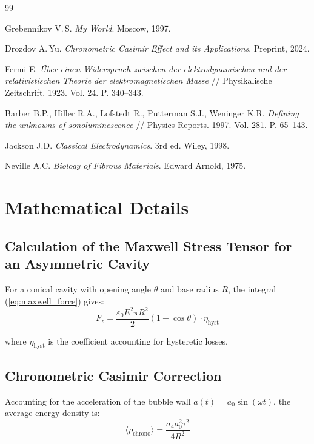 \documentclass[12pt,a4paper]{article}
\begin{document}
\begin{thebibliography}{99}

Grebennikov V.\,S. \textit{My World}. Moscow, 1997.

Drozdov A.\,Yu. \textit{Chronometric Casimir Effect and its Applications}. Preprint, 2024.

Fermi E. \textit{\"Uber einen Widerspruch zwischen der elektrodynamischen und der relativistischen Theorie der elektromagnetischen Masse} // Physikalische Zeitschrift. 1923. Vol. 24. P. 340--343.

Barber B.P., Hiller R.A., Lofstedt R., Putterman S.J., Weninger K.R. \textit{Defining the unknowns of sonoluminescence} // Physics Reports. 1997. Vol. 281. P. 65--143.

Jackson J.D. \textit{Classical Electrodynamics}. 3rd ed. Wiley, 1998.

Neville A.C. \textit{Biology of Fibrous Materials}. Edward Arnold, 1975.

\end{thebibliography}

\appendix

\section{Mathematical Details}

\subsection{Calculation of the Maxwell Stress Tensor for an Asymmetric Cavity}

For a conical cavity with opening angle $\theta$ and base radius $R$, the integral (\ref{eq:maxwell_force}) gives:
\begin{equation}
    F_z = \frac{\varepsilon_0 E^2 \pi R^2}{2} (1 - \cos\theta) \cdot \eta_{\text{hyst}}
    \label{eq:cone_force}
\end{equation}

where $\eta_{\text{hyst}}$ is the coefficient accounting for hysteretic losses.

\subsection{Chronometric Casimir Correction}

Accounting for the acceleration of the bubble wall $a(t) = a_0 \sin(\omega t)$, the average energy density is:
\begin{equation}
    \langle \rho_{\text{chrono}} \rangle = \frac{\sigma_4 a_0^2 \tau^2}{4 R^2}
    \label{eq:chrono_avg}
\end{equation}
\end{document}
